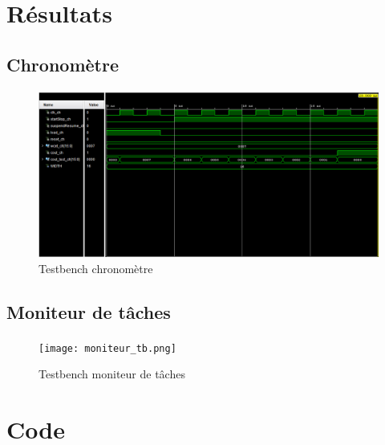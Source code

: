 \documentclass[a4paper,12pt]{report}
\begin{document}
			\paragraph*{}
			
			
	\section{Résultats}
		\subsection{Chronomètre}
			\paragraph*{}
			
			\begin{figure}[H]
				\centering
					\includegraphics[scale=0.5]{chrono_tb.png}
					\caption{Testbench chronomètre}
				\label{chronoTB}
			\end{figure}
			
		\subsection{Moniteur de tâches}
			\paragraph*{}
	
			\begin{figure}[H]
				\centering
					\texttt{[image: moniteur\_tb.png]}
					\caption{Testbench moniteur de tâches}
				\label{monitorTB}
			\end{figure}
			
			
	\section{Code}
\end{document}
